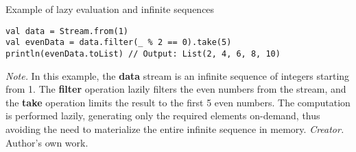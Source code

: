 \begin{table}[h!]
\caption{Example of lazy evaluation and infinite sequences}
\begin{lstlisting}
val data = Stream.from(1)
val evenData = data.filter(_ % 2 == 0).take(5)
println(evenData.toList) // Output: List(2, 4, 6, 8, 10)
\end{lstlisting}
\small
\textit{Note.} In this example, the \textbf{data} stream is an infinite sequence of integers starting from 1. The \textbf{filter} operation lazily filters the even numbers from the stream, and the \textbf{take} operation limits the result to the first 5 even numbers. The computation is performed lazily, generating only the required elements on-demand, thus avoiding the need to materialize the entire infinite sequence in memory.
\textit{Creator.} Author's own work.
\end{table}